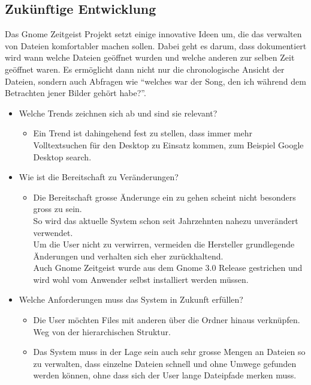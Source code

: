 \documentclass[10pt,paper=a4,final]{scrartcl}
\begin{document}
\subsection{Zuk\"unftige Entwicklung}
Das Gnome Zeitgeist Projekt\cite{activity_journal} setzt einige innovative Ideen um, die das verwalten von Dateien komfortabler machen sollen.
Dabei geht es darum, dass dokumentiert wird wann welche Dateien geöffnet wurden und welche anderen zur selben Zeit geöffnet waren. Es ermöglicht dann nicht nur die chronologische Ansicht der Dateien, sondern auch Abfragen wie “welches war der Song, den ich während dem Betrachten jener Bilder gehört habe?”.
\begin{itemize}
  \item Welche Trends zeichnen sich ab und sind sie relevant?
    \begin{itemize}
      \item Ein Trend ist dahingehend fest zu stellen, dass immer mehr Volltextsuchen für den Desktop zu Einsatz kommen, zum Beispiel Google Desktop search\cite{google_desktop}.
    \end{itemize}
  \item Wie ist die Bereitschaft zu Veränderungen? 
    \begin{itemize}
      \item Die Bereitschaft grosse Änderunge ein zu gehen scheint nicht besonders gross zu sein.\\
	So wird das aktuelle System schon seit Jahrzehnten nahezu unverändert verwendet.\\
	Um die User nicht zu verwirren, vermeiden die Hersteller grundlegende Änderungen und verhalten sich eher zurückhaltend.\\
	Auch Gnome Zeitgeist wurde aus dem Gnome 3.0 Release gestrichen\cite{gnome3} und wird wohl vom Anwender selbst installiert werden müssen.
    \end{itemize}
  \item Welche Anforderungen muss das System in Zukunft erfüllen?
    \begin{itemize}
      \item Die User möchten Files mit anderen über die Ordner hinaus verknüpfen. Weg von der hierarchischen Struktur.
      \item Das System muss in der Lage sein auch sehr grosse Mengen an Dateien so zu verwalten, dass einzelne Dateien schnell und ohne Umwege gefunden werden können, ohne dass sich der User lange Dateipfade merken muss.
    \end{itemize}

\end{itemize}
\end{document}
